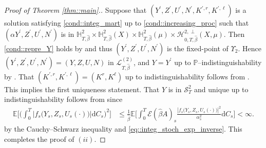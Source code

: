 \documentclass[10pt]{article} %
\newcommand\cE{\mathcal E}
\newcommand\cH{\mathcal H}
\newcommand\cL{\mathcal L}
\newcommand\cS{\mathcal S}
\def \E{\mathbb{E}}
\def \H{\mathbb{H}}
\def \P{\mathbb{P}}
\newcommand{\1}{\mathbf{1}}
\def\d{\mathrm{d}}
\begin{document}
\begin{proof}[Proof of Theorem \ref{thm::main}.]
	\medskip
	Suppose that $(Y^\prime,Z^\prime,U^\prime,N^\prime,K^{\prime,r},K^{\prime,\ell})$ is a solution satisfying \ref{cond::integ_mart} up to \ref{cond::increasing_proc} such that $(\alpha Y^\prime,Z^\prime,U^\prime,N^\prime)$ is in $\H^2_{T,\hat\beta} \times \H^2_{T,\hat\beta}(X) \times \H^2_{T,\hat\beta}(\mu) \times \cH^{2,\perp}_{0,T,\hat\beta}(X,\mu)$. Then \ref{cond::repre_Y} holds by  and thus $(Y^\prime,Z^\prime,U^\prime,N^\prime)$ is the fixed-point of $\Upsilon_2$. Hence $(Y^\prime,Z^\prime,U^\prime,N^\prime) = (Y,Z,U,N)$ in $\cL^{(2)}_{T,\hat\beta}$, and $Y = Y^\prime$ up to $\P$--indistinguishability by . That $(K^{\prime,r},K^{\prime,\ell}) = (K^r,K^\ell)$ up to indistinguishability follows from . 
	This implies the first uniqueness statement. That $Y$ is in $\cS^2_T$ and unique up to indistinguishability follows from  since
	\begin{align*}
		\E\bigg[\bigg(\int_0^T |f_s\big(Y_s,Z_s,U_s(\cdot)\big)| \d C_s\bigg)^2\bigg] 
		&\leq \frac{1}{\hat\beta}\E\bigg[\int_0^T \cE(\hat\beta A)_s\frac{|f_s\big(Y_s,Z_s,U_s(\cdot)\big)|^2}{\alpha^2_s} \d C_s\bigg] < \infty.
	\end{align*}
	by the Cauchy--Schwarz inequality and \eqref{eq::integ_stoch_exp_inverse}.
	This completes the proof of $(ii)$. 
	

\end{proof}
\end{document}
